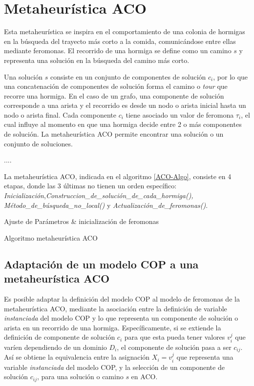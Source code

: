 \section{Metaheur\'istica ACO}
\label{sec:hormigas}
Esta metaheur\'istica se inspira en el comportamiento de una colonia de hormigas en la b\'usqueda del trayecto m\'as corto a la comida, comunic\'andose entre ellas mediante feromonas. El recorrido de una hormiga se define como un camino $s$ y representa una soluci\'on en la b\'usqueda del camino m\'as corto.

Una soluci\'on $s$ consiste en un conjunto de componentes de soluci\'on $c_{i}$, por lo que una concatenaci\'on de componentes de soluci\'on forma el camino o {\it tour} que recorre una hormiga. En el caso de un grafo, una componente de soluci\'on corresponde a una arista y el recorrido es desde un nodo o arista inicial hasta un nodo o arista final. Cada componente $c_{i}$ tiene asociado un valor de feromona $\tau_i$, el cual influye al momento en que una hormiga decide entre 2 o m\'as componentes de soluci\'on. La metaheur\'istica ACO permite encontrar una soluci\'on o un conjunto de soluciones. 


....


La metaheur\'istica ACO, indicada en el algoritmo \ref{ACO-Algo}, consiste en 4 etapas, donde las 3 \'ultimas no tienen un orden espec\'ifico: {\it Inicializaci\'on},{\it Construccion\_de\_soluci\'on\_de\_cada\_hormiga(),  M\'etodo\_de\_b\'usqueda\_no\_local()} y {\it Actualizaci\'on\_de\_feromonas()}.

\begin{algorithm}[H]
\SetAlgoLined
 Ajuste de Par\'ametros \& inicializaci\'on de feromonas \;
 \caption{Algoritmo metaheur\'istica ACO}\label{ACO-Algo}
\end{algorithm}

\subsection{Adaptaci\'on de un modelo COP a una metaheur\'istica ACO}

Es posible adaptar la definici\'on del modelo COP al modelo de feromonas de la metaheur\'istica ACO, mediante la asociaci\'on entre la definici\'on de variable {\it instanciada} del modelo COP y lo que representa un componente de soluci\'on o arista en un recorrido de una hormiga. 
Espec\'ificamente, si se extiende la definici\'on de componente de soluci\'on $c_{i}$ para que esta pueda tener valores $v_{i}^{j}$ que var\'ien dependiendo de un dominio $D_i$, el componente de soluci\'on pasa a ser $c_{ij}$. As\'i se obtiene la equivalencia entre la asignaci\'on $X_i = v_{i}^{j}$ que representa una variable {\it instanciada} del modelo COP, y la selecci\'on de un componente de soluci\'on $c_{ij}$,  para una soluci\'on o camino $s$ en ACO.

